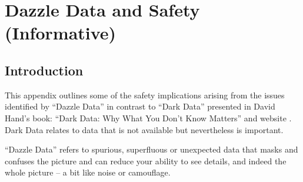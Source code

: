 %
\section{Dazzle Data and Safety (Informative)} \label{bkm:dazzledata}
%



\subsection{Introduction}
This appendix outlines some of the safety implications arising from the issues identified by
``Dazzle Data'' in contrast to ``Dark Data'' presented in David Hand's book:
``Dark Data: Why What You Don't Know Matters'' \cite{citation:darkdata:hand}
and website \cite{citation:darkdata:website}.
Dark Data relates to data that is not available but nevertheless is important.

``Dazzle Data'' refers to spurious, superfluous or unexpected data that masks and confuses the picture and can reduce your ability to see details, and indeed the whole picture -- a bit like noise or camouflage.

